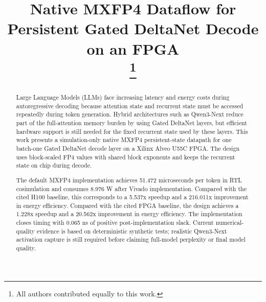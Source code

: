 ﻿\documentclass[conference]{IEEEtran}
\begin{document}
\title{Native MXFP4 Dataflow for Persistent Gated DeltaNet Decode on an FPGA\\
\thanks{All authors contributed equally to this work.}
}

\author{
\and
{}
}

\maketitle

\begin{abstract}
Large Language Models (LLMs) face increasing latency and energy costs during autoregressive decoding because attention state and recurrent state must be accessed repeatedly during token generation. Hybrid architectures such as Qwen3-Next reduce part of the full-attention memory burden by using Gated DeltaNet layers, but efficient hardware support is still needed for the fixed recurrent state used by these layers. This work presents a simulation-only native MXFP4 persistent-state datapath for one batch-one Gated DeltaNet decode layer on a Xilinx Alveo U55C FPGA. The design uses block-scaled FP4 values with shared block exponents and keeps the recurrent state on chip during decode.

The default MXFP4 implementation achieves 51.472 microseconds per token in RTL cosimulation and consumes 8.976 W after Vivado implementation. Compared with the cited H100 baseline, this corresponds to a 5.537x speedup and a 216.011x improvement in energy efficiency. Compared with the cited FPGA baseline, the design achieves a 1.228x speedup and a 20.562x improvement in energy efficiency. The implementation closes timing with 0.065 ns of positive post-implementation slack. Current numerical-quality evidence is based on deterministic synthetic tests; realistic Qwen3-Next activation capture is still required before claiming full-model perplexity or final model quality.
\end{abstract}
\end{document}
